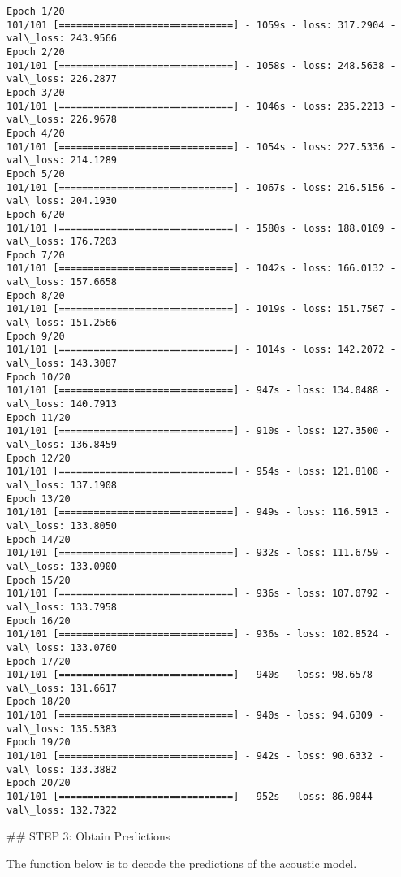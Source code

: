 \documentclass[11pt]{article}
\begin{document}
    \begin{Verbatim}[commandchars=\\\{\}]
Epoch 1/20
101/101 [==============================] - 1059s - loss: 317.2904 - val\_loss: 243.9566
Epoch 2/20
101/101 [==============================] - 1058s - loss: 248.5638 - val\_loss: 226.2877
Epoch 3/20
101/101 [==============================] - 1046s - loss: 235.2213 - val\_loss: 226.9678
Epoch 4/20
101/101 [==============================] - 1054s - loss: 227.5336 - val\_loss: 214.1289
Epoch 5/20
101/101 [==============================] - 1067s - loss: 216.5156 - val\_loss: 204.1930
Epoch 6/20
101/101 [==============================] - 1580s - loss: 188.0109 - val\_loss: 176.7203
Epoch 7/20
101/101 [==============================] - 1042s - loss: 166.0132 - val\_loss: 157.6658
Epoch 8/20
101/101 [==============================] - 1019s - loss: 151.7567 - val\_loss: 151.2566
Epoch 9/20
101/101 [==============================] - 1014s - loss: 142.2072 - val\_loss: 143.3087
Epoch 10/20
101/101 [==============================] - 947s - loss: 134.0488 - val\_loss: 140.7913
Epoch 11/20
101/101 [==============================] - 910s - loss: 127.3500 - val\_loss: 136.8459
Epoch 12/20
101/101 [==============================] - 954s - loss: 121.8108 - val\_loss: 137.1908
Epoch 13/20
101/101 [==============================] - 949s - loss: 116.5913 - val\_loss: 133.8050
Epoch 14/20
101/101 [==============================] - 932s - loss: 111.6759 - val\_loss: 133.0900
Epoch 15/20
101/101 [==============================] - 936s - loss: 107.0792 - val\_loss: 133.7958
Epoch 16/20
101/101 [==============================] - 936s - loss: 102.8524 - val\_loss: 133.0760
Epoch 17/20
101/101 [==============================] - 940s - loss: 98.6578 - val\_loss: 131.6617
Epoch 18/20
101/101 [==============================] - 940s - loss: 94.6309 - val\_loss: 135.5383
Epoch 19/20
101/101 [==============================] - 942s - loss: 90.6332 - val\_loss: 133.3882
Epoch 20/20
101/101 [==============================] - 952s - loss: 86.9044 - val\_loss: 132.7322

    \end{Verbatim}

     \#\# STEP 3: Obtain Predictions

The function below is to decode the predictions of the acoustic model.
\end{document}

